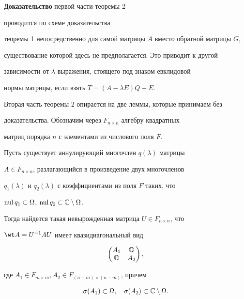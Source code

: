 {\bf Доказательство} первой части теоремы 2


проводится по схеме доказательства


теоремы 1 непосредственно для самой матрицы $A$ вместо обратной матрицы $G$,


существование которой здесь не предполагается. Это приводит к другой 


зависимости от $\lambda$ выражения, стоящего под знаком евклидовой


нормы матрицы, если взять $T=(A-\lambda E)Q+E$.


Вторая часть теоремы 2 опирается на две леммы, которые принимаем без


доказательства. Обозначим через $F_{n\times n}$ алгебру квадратных


матриц порядка $n$ с элементами из числового поля $F$.





\begin{lem}


Пусть существует аннулирующий многочлен $q(\lambda)$ матрицы


$A\in F_{n\times n}$, разлагающийся в произведение двух многочленов


$q_1(\lambda)$ и $q_2(\lambda)$ с коэффициентами из поля $F$ таких, что


$\operatorname{nul} q_1\subset\Omega$, $\operatorname{nul} q_2\subset\Bbb C\setminus\Omega$.


Тогда найдется такая невырожденная матрица $U\in F_{n\times n}$,  что


$\wt A = U^{-1}AU$ имеет квазидиагональный вид


\begin{equation}\label{eq9}


\begin{pmatrix}


A_1 & \Bbb O \\


\Bbb O & A_2


\end{pmatrix}, 


\end{equation}


где $A_1\in F_{m\times m}, A_2\in F_{(n-m)\times(n-m)}$, причем


$$


\sigma(A_1)\subset\Omega, \quad \sigma(A_2)\subset\Bbb C\setminus\Omega.


$$


\end{lem}





